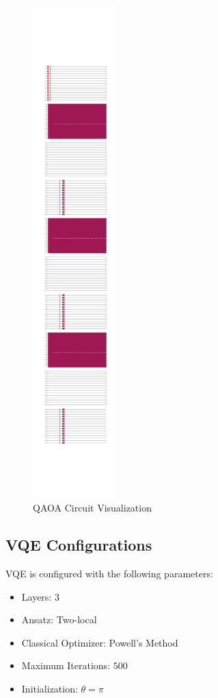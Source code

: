 \documentclass{article}%
\begin{document}
\begin{figure}[h!]%
\centering%
\includegraphics[width=120px]{quantum_circuit_qaoa.png}%
\caption{QAOA Circuit Visualization}%
\end{figure}

%
\subsection{VQE Configurations}%
\label{subsec:VQEConfigurations}%
VQE is configured with the following parameters:\newline%
%
\begin{itemize}%
\item%
Layers: \(3\)%
\item%
Ansatz: Two-local%
\item%
Classical Optimizer: Powell's Method%
\item%
Maximum Iterations: \(500\)%
\item%
Initialization: \(\theta = \pi\)%
\end{itemize}
\end{document}

